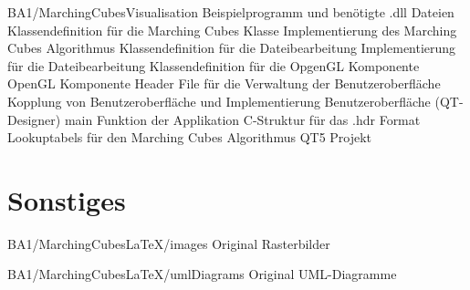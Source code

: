 \begin{FileList}{BA1/MarchingCubesVisualisation}
	 Beispielprogramm und benötigte .dll Dateien
	 Klassendefinition für die Marching Cubes Klasse
	 Implementierung des Marching Cubes Algorithmus
	 Klassendefinition für die Dateibearbeitung
	 Implementierung für die Dateibearbeitung
	 Klassendefinition für die OpgenGL Komponente
	 OpenGL Komponente
	  Header File für die Verwaltung der Benutzeroberfläche
	 Kopplung von Benutzeroberfläche und Implementierung 
	 Benutzeroberfläche (QT-Designer)
	 main Funktion der Applikation
	 C-Struktur für das .hdr Format
	 Lookuptabels für den Marching Cubes Algorithmus
	 QT5 Projekt
	
\end{FileList}

\section{Sonstiges}

\begin{FileList}{BA1/MarchingCubesLaTeX/images}
	 Original Rasterbilder %
\end{FileList}

\begin{FileList}{BA1/MarchingCubesLaTeX/umlDiagrams}
	 Original UML-Diagramme
\end{FileList}